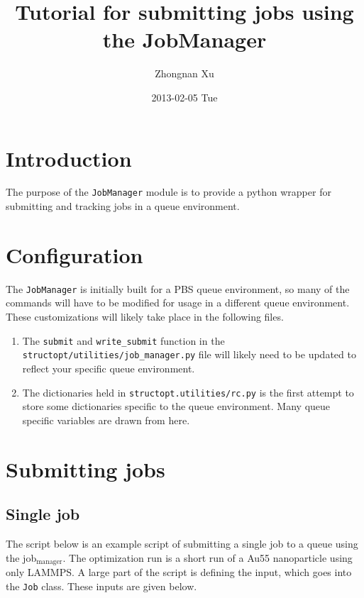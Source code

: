 \documentclass[11pt]{article}
\author{Zhongnan Xu}
\date{2013-02-05 Tue}
\title{Tutorial for submitting jobs using the JobManager}
\begin{document}
\maketitle
\tableofcontents

\section{Introduction}
\label{sec-introduction}
The purpose of the \texttt{JobManager} module is to provide a python wrapper for submitting and tracking jobs in a queue environment.

\section{Configuration}
\label{sec-configuration}
The \texttt{JobManager} is initially built for a PBS queue environment, so many of the commands will have to be modified for usage in a different queue environment. These customizations will likely take place in the following files.

\begin{enumerate}
\item The \texttt{submit} and \texttt{write\_submit} function in the \texttt{structopt/utilities/job\_manager.py} file will likely need to be updated to reflect your specific queue environment.

\item The dictionaries held in \texttt{structopt.utilities/rc.py} is the first attempt to store some dictionaries specific to the queue environment. Many queue specific variables are drawn from here.
\end{enumerate}

\section{Submitting jobs}
\label{sec-submit}
\subsection{Single job}
\label{sec-submit-single}
The script below is an example script of submitting a single job to a queue using the job\(_{\text{manager}}\). The optimization run is a short run of a Au55 nanoparticle using only LAMMPS. A large part of the script is defining the input, which goes into the \texttt{Job} class. These inputs are given below.
\end{document}
